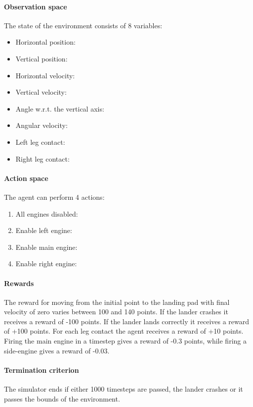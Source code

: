 \documentclass[review,english]{elsarticle}
\begin{document}
\paragraph{Observation space}
The state of the environment consists of 8 variables:
\begin{itemize}
    \item Horizontal position: 
    \item Vertical position: 
    \item Horizontal velocity: 
    \item Vertical velocity: 
    \item Angle w.r.t. the vertical axis: 
    \item Angular velocity: 
    \item Left leg contact: 
    \item Right leg contact: 
\end{itemize}

\paragraph{Action space}
The agent can perform 4 actions:
\begin{enumerate}
    \item All engines disabled: 
    \item Enable left engine: 
    \item Enable main engine: 
    \item Enable right engine: 
\end{enumerate}

\paragraph{Rewards}
The reward for moving from the initial point to the landing pad with final velocity of zero varies between 100 and 140 points.
If the lander crashes it receives a reward of -100 points.
If the lander lands correctly it receives a reward of +100 points.
For each leg contact the agent receives a reward of +10 points.
Firing the main engine in a timestep gives a reward of -0.3 points, while firing a side-engine gives a reward of -0.03.

\paragraph{Termination criterion}
The simulator ends if either 1000 timesteps are passed, the lander crashes or it passes the bounds of the environment.
\end{document}
